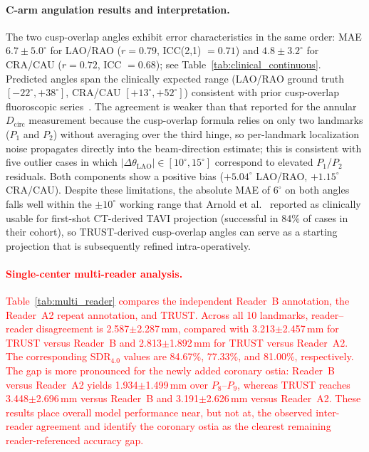 \documentclass[conference]{IEEEtran}
\begin{document}
\paragraph{C-arm angulation results and interpretation.}
The two cusp-overlap angles exhibit error characteristics in the same order: MAE $6.7 \pm 5.0^\circ$ for LAO/RAO ($r = 0.79$, ICC(2,1) $= 0.71$) and $4.8 \pm 3.2^\circ$ for CRA/CAU ($r = 0.72$, ICC $= 0.68$); see Table~\ref{tab:clinical_continuous}. Predicted angles span the clinically expected range (LAO/RAO ground truth $[-22^\circ, +38^\circ]$, CRA/CAU $[+13^\circ, +52^\circ]$) consistent with prior cusp-overlap fluoroscopic series~\cite{Pascual2022_cusp_overlap}. The agreement is weaker than that reported for the annular $D_{\text{circ}}$ measurement because the cusp-overlap formula relies on only two landmarks ($P_1$ and $P_2$) without averaging over the third hinge, so per-landmark localization noise propagates directly into the beam-direction estimate; this is consistent with five outlier cases in which $|\Delta\theta_{\text{LAO}}| \in [10^\circ, 15^\circ]$ correspond to elevated $P_1$/$P_2$ residuals. Both components show a positive bias ($+5.04^\circ$ LAO/RAO, $+1.15^\circ$ CRA/CAU). Despite these limitations, the absolute MAE of $6^\circ$ on both angles falls well within the $\pm 10^\circ$ working range that Arnold et al.~\cite{Arnold2012_carm_projection} reported as clinically usable for first-shot CT-derived TAVI projection (successful in 84\% of cases in their cohort), so TRUST-derived cusp-overlap angles can serve as a starting projection that is subsequently refined intra-operatively.

\paragraph{\textcolor{red}{Single-center multi-reader analysis.}}
\textcolor{red}{Table~\ref{tab:multi_reader} compares the independent Reader~B annotation, the Reader~A2 repeat annotation, and TRUST. Across all 10 landmarks, reader--reader disagreement is 2.587$\pm$2.287\,mm, compared with 3.213$\pm$2.457\,mm for TRUST versus Reader~B and 2.813$\pm$1.892\,mm for TRUST versus Reader~A2. The corresponding SDR$_{4.0}$ values are 84.67\%, 77.33\%, and 81.00\%, respectively. The gap is more pronounced for the newly added coronary ostia: Reader~B versus Reader~A2 yields 1.934$\pm$1.499\,mm over $P_8$--$P_9$, whereas TRUST reaches 3.448$\pm$2.696\,mm versus Reader~B and 3.191$\pm$2.626\,mm versus Reader~A2. These results place overall model performance near, but not at, the observed inter-reader agreement and identify the coronary ostia as the clearest remaining reader-referenced accuracy gap.}
\end{document}
